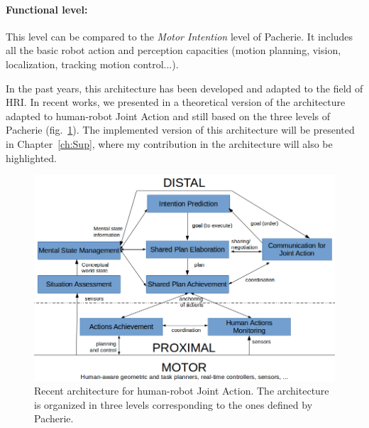 \documentclass[english,a4paper,11pt,twoside]{StyleThese}
\begin{document}
\paragraph{Functional level:}
This level can be compared to the \textit{Motor Intention} level of Pacherie. It includes all the basic robot action and perception capacities (motion planning, vision, localization, tracking motion control...). 

\bigskip
In the past years, this architecture has been developed and adapted to the field of HRI. In recent works, we presented in \cite{devin2016some} a theoretical version of the architecture adapted to human-robot Joint Action and still based on the three levels of Pacherie (fig.~\ref{fig:ArchiThreeLevels}). The implemented version of this architecture will be presented in Chapter~\ref{ch:Sup}, where my contribution in the architecture will also be highlighted.

\begin{figure}[!h]
	\centering
    \includegraphics[width=\textwidth]{figs/Chapter1/architecture.png}
    \caption{Recent architecture for human-robot Joint Action. The architecture is organized in three levels corresponding to the ones defined by Pacherie.}
    \label{fig:ArchiThreeLevels}
\end{figure}
\end{document}
